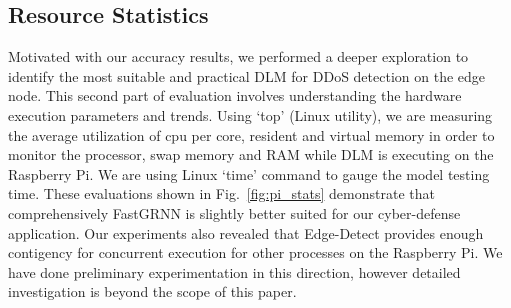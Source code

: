 \documentclass[conference]{IEEEtran}
\begin{document}
\subsection{Resource Statistics}

\noindent Motivated with our accuracy results, we performed a deeper exploration to identify the most suitable and practical DLM for DDoS detection on the edge node.  
This second part of evaluation involves understanding the hardware execution parameters and trends. Using `top' (Linux utility), we are measuring the average utilization of cpu per core, resident and virtual memory in order to monitor the processor, swap memory and RAM while DLM is executing on the Raspberry Pi. We are using Linux `time' command to gauge the model testing time. These evaluations shown in Fig.~\ref{fig:pi_stats} demonstrate that comprehensively FastGRNN is slightly better suited for our cyber-defense application. Our experiments also revealed that Edge-Detect provides enough contigency for concurrent execution for other processes on the Raspberry Pi. We have done preliminary experimentation in this direction, however detailed investigation is beyond the scope of this paper.

\iffalse
\begin{figure*}
     \centering
     \begin{subfigure}[a]{\textwidth}
         \centering
         \texttt{[image: images/results/resource\_utilization.png]}
         \caption{Resource stats from Raspberry PI for top 2 FastRNN \& GRNN models}
         \label{fig:cpu_percentage_per_core}
     \end{subfigure}
    
     \centering
     \begin{subfigure}[b]{\textwidth}
         \centering
         \texttt{[image: images/results/wall\_clock\_time.png]}
        \centering
        \caption{Wall Clock Running time from Raspberry PI for top 2 FastRNN \& GRNN models}
        \label{fig:pi_stats}
        \end{subfigure}
\end{figure*}
\fi
\end{document}
